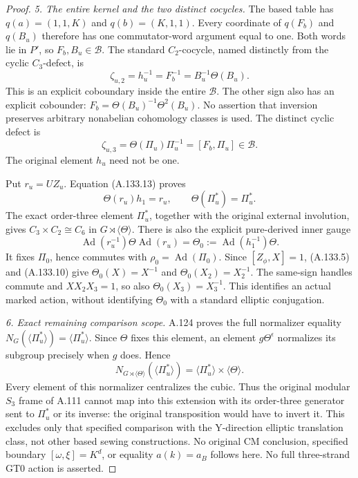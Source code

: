 \begin{proof}
\par\smallskip\noindent\emph{5. The entire kernel and the two distinct cocycles.}
The based table has
\(q(a)=(1,1,K)\) and \(q(b)=(K,1,1)\).
Every coordinate of \(q(F_b)\) and \(q(B_u)\) therefore has
one commutator-word argument equal to one. Both words lie in
\(P'\), so \(F_b,B_u\in\mathcal B\).
The standard \(C_2\)-cocycle, named distinctly from the cyclic
\(C_3\)-defect, is
\[
 \zeta_{u,2}=h_u^{-1}=F_b^{-1}
                =B_u^{-1}\Theta(B_u).
 \tag{A.133.14}
\]
This is an explicit coboundary inside the entire \(\mathcal B\).
The other sign also has an explicit cobounder:
\(F_b=\Theta(B_u)^{-1}\Theta^2(B_u)\).
No assertion that inversion preserves arbitrary nonabelian
cohomology classes is used. The distinct cyclic defect is
\[
 \zeta_{u,3}=\Theta(\Pi_u)\Pi_u^{-1}=[F_b,\Pi_u]
          \in\mathcal B.
\]
The original element \(h_u\) need not be one.

Put \(r_u=UZ_u\). Equation (A.133.13) proves
\[
 \Theta(r_u)h_1=r_u,\qquad
 \Theta(\Pi_u^*)=\Pi_u^*.
\]
The exact order-three element \(\Pi_u^*\), together with the
original external involution, gives \(C_3\times C_2\cong C_6\)
in \(G\rtimes\langle\Theta\rangle\).
There is also the explicit pure-derived inner gauge
\[
 \operatorname{Ad}(r_u^{-1})\Theta\operatorname{Ad}(r_u)
      =\Theta_0:=\operatorname{Ad}(h_1^{-1})\Theta.
 \tag{A.133.15}
\]
It fixes \(\Pi_0\), hence commutes with
\(\rho_0=\operatorname{Ad}(\Pi_0)\).
Since \([Z_\phi,X]=1\), (A.133.5) and (A.133.10) give
\(\Theta_0(X)=X^{-1}\) and
\(\Theta_0(X_2)=X_2^{-1}\). The same-sign handles commute
and \(XX_2X_3=1\), so also
\(\Theta_0(X_3)=X_3^{-1}\).
This identifies an actual marked action, without identifying
\(\Theta_0\) with a standard elliptic conjugation.

\par\smallskip\noindent\emph{6. Exact remaining comparison scope.}
A.124 proves the full normalizer equality
\(N_G(\langle\Pi_u^*\rangle)=\langle\Pi_u^*\rangle\).
Since \(\Theta\) fixes this element, an element
\(g\Theta^\epsilon\) normalizes its subgroup precisely when
\(g\) does. Hence
\[
 N_{G\rtimes\langle\Theta\rangle}
       (\langle\Pi_u^*\rangle)
   =\langle\Pi_u^*\rangle\times\langle\Theta\rangle.
\]
Every element of this normalizer centralizes the cubic. Thus the
original modular \(S_3\) frame of A.111 cannot map into this
extension with its order-three generator sent to \(\Pi_u^*\)
or its inverse: the original transposition would have to invert it.
This excludes only that specified comparison with the Y-direction
elliptic translation class, not other based sewing constructions.
No original CM conclusion, specified boundary
\([\omega,\xi]=K^d\), or equality \(a(k)=a_B\) follows here.
No full three-strand GT0 action is asserted.
\end{proof}

